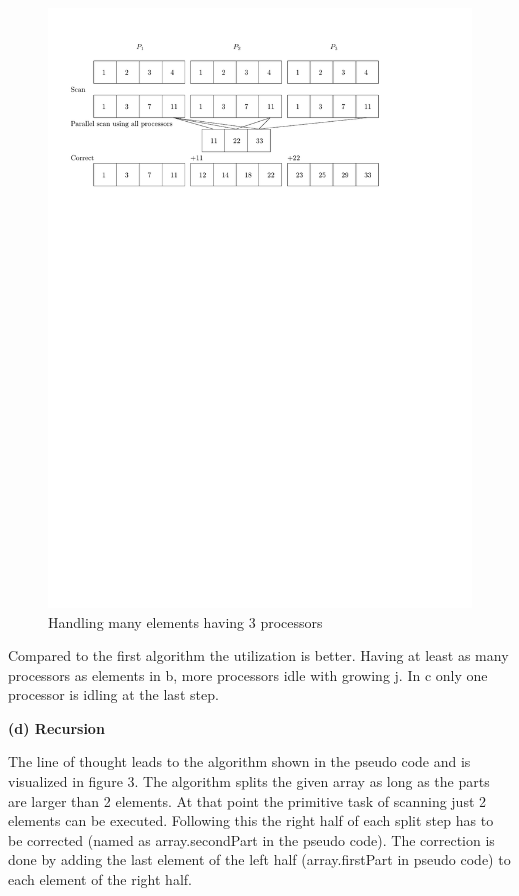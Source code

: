 \documentclass[a4paper,twoside,11pt]{article}
\begin{document}
\begin{figure}[hbtp]
\centering
\label{fig:le}
\includegraphics[scale=1]{le}
\caption{Handling many elements having 3 processors}
\end{figure}

Compared to the first algorithm the utilization is better. Having at least as many processors as elements in b, more processors idle with growing j. In c only one processor is idling at the last step.

\newpage
\textbf{(d) Recursion}

The line of thought leads to the algorithm shown in the pseudo code and is visualized in figure 3. The algorithm splits the given array as long as the parts are larger than 2 elements. At that point the primitive task of scanning just 2 elements can be executed. Following this the right half of each split step has to be corrected (named as array.secondPart in the pseudo code). The correction is done by adding the last element of the left half (array.firstPart in pseudo code) to each element of the right half.
\end{document}
